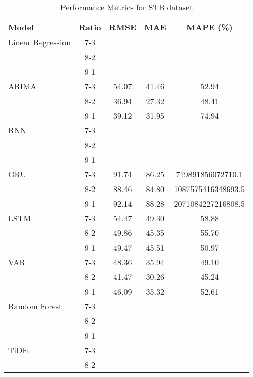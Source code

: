 \begin{table}[h!]
    \centering
    \caption{Performance Metrics for STB dataset}
    \begin{tabular}{|l|c|c|c|c|}
    \hline
    \rowcolor{orange!30} \textbf{Model} & \textbf{Ratio} & \textbf{RMSE} & \textbf{MAE} & \textbf{MAPE (\%)} \\ \hline
    \rowcolor{white} Linear Regression & 7-3 &  &  &  \\ \hline
    \rowcolor{white}  & 8-2 &  &  &  \\ \hline
    \rowcolor{white}  & 9-1 &  &  &  \\ \hline
    \rowcolor{white} ARIMA & 7-3 & 54.07 & 41.46 & 52.94 \\ \hline
    \rowcolor{white}  & 8-2 & 36.94 & 27.32 & 48.41 \\ \hline
    \rowcolor{white}  & 9-1 & 39.12 & 31.95 & 74.94 \\ \hline
    \rowcolor{white} RNN & 7-3 &  &  &  \\ \hline
    \rowcolor{white}  & 8-2 &  &  &  \\ \hline
    \rowcolor{white}  & 9-1 &  &  &  \\ \hline
    \rowcolor{white} GRU & 7-3 & 91.74 & 86.25 & 719891856072710.1 \\ \hline
    \rowcolor{white}  & 8-2 & 88.46 & 84.80 &  1087575416348693.5 \\ \hline
    \rowcolor{white}  & 9-1 & 92.14 & 88.28 & 2071084227216808.5 \\ \hline
    \rowcolor{white} LSTM & 7-3 & 54.47 & 49.30 & 58.88 \\ \hline
    \rowcolor{white}  & 8-2 & 49.86 & 45.35 & 55.70 \\ \hline
    \rowcolor{white}  & 9-1 & 49.47 & 45.51 & 50.97 \\ \hline
    \rowcolor{white} VAR & 7-3 & 48.36 & 35.94 & 49.10 \\ \hline
    \rowcolor{white}  & 8-2 & 41.47 & 30.26 & 45.24 \\ \hline
    \rowcolor{white}  & 9-1 & 46.09 & 35.32 & 52.61 \\ \hline
    \rowcolor{white} Random Forest & 7-3 &  &  &  \\ \hline
    \rowcolor{white}  & 8-2 &  &  &  \\ \hline
    \rowcolor{white}  & 9-1 &  &  &  \\ \hline
    \rowcolor{green!30} TiDE & 7-3 &  &  &  \\ \hline
    \rowcolor{green!30}  & 8-2 &  &  &  \\ \hline

\end{tabular}
\end{table}
